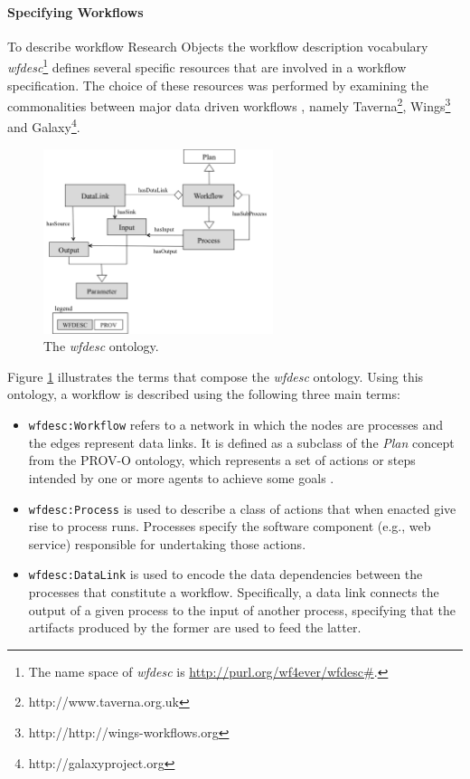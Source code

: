 \paragraph{Specifying Workflows}
To describe workflow Research Objects the workflow description vocabulary \textit{wfdesc}\footnote{The name space of \textit{wfdesc} is \url{http://purl.org/wf4ever/wfdesc\#}.} defines several specific resources that are involved in a workflow specification. The choice of these resources was performed by examining the commonalities between major data driven workflows \cite{TDG+07}, namely Taverna\footnote{http://www.taverna.org.uk}, Wings\footnote{http://http://wings-workflows.org} and Galaxy\footnote{http://galaxyproject.org}.

\begin{figure}[ht]
  \centering
  \includegraphics[width=0.6\textwidth]{Figures/wfdesc.png}
  \caption{The \textit{wfdesc} ontology.}
  \label{fig:wfdesc}
\end{figure}

Figure \ref{fig:wfdesc} illustrates the terms that compose the \textit{wfdesc} ontology. Using this ontology, a workflow is described using the following three main terms:
\begin{itemize}
\item
\texttt{wfdesc:Workflow} refers to a network in which the nodes are processes and the edges represent data links. It is defined as a subclass of the \textit{Plan} concept from the PROV-O ontology, which represents a set of actions or steps intended by one or more agents to achieve some goals \cite{w3c-prov-o}. 
\item
\texttt{wfdesc:Process} is used to describe a class of actions that when enacted give rise to process runs. Processes specify the software component (e.g., web service) responsible for undertaking those actions.
\item
\texttt{wfdesc:DataLink} is used to encode the data dependencies between the processes that constitute a workflow. Specifically, a data link connects the output of a given process to the input of another process, specifying that the artifacts produced by the former are used to feed the latter.
\end{itemize}


